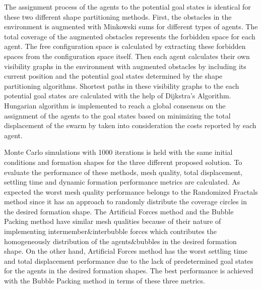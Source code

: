 The assignment process of the agents to the potential goal states is identical for these two different shape partitioning methods. First, the obstacles in the environment is augmented with Minkowski sums for different types of agents. The total coverage of the augmented obstacles represents the forbidden space for each agent. The free configuration space is calculated by extracting these forbidden spaces from the configuration space itself. Then each agent calculates their own visibility graphs in the environment with augmented obstacles by including its current position and the potential goal states determined by the shape partitioning algorithms. Shortest paths in these visibility graphs to the each potential goal states are calculated with the help of Dijkstra's Algorithm. Hungarian algorithm is implemented to reach a global consensus on the assignment of the agents to the goal states based on minimizing the total displacement of the swarm by taken into consideration the costs reported by each agent. 
       
Monte Carlo simulations with 1000 iterations is held with the same initial conditions and formation shapes for the three different proposed solution. To evaluate the performance of these methods, mesh quality, total displacement, settling time and dynamic formation performance metrics are calculated. As expected the worst mesh quality performance belongs to the Randomized Fractals method since it has an approach to randomly distribute the coverage circles in the desired formation shape. The Artificial Forces method and the Bubble Packing method have similar mesh qualities because of their nature of implementing intermember$\&$interbubble forces which contributes the homogeneously distribution of the agents$\&$bubbles in the desired formation shape. On the other hand, Artificial Forces method has the worst settling time and total displacement performance due to the lack of predetermined goal states for the agents in the desired formation shapes. The best performance is achieved with the Bubble Packing method in terms of these three metrics.
       

